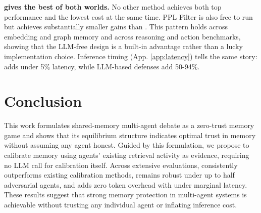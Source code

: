  \textbf{\system gives the best of both worlds.} No other method achieves both top performance and the lowest cost at the same time. PPL Filter is also free to run but achieves substantially smaller gains than \system. This pattern holds across embedding and graph memory and across reasoning and action benchmarks, showing that the LLM-free design is a built-in advantage rather than a lucky implementation choice. Inference timing (App. \ref{app:latency}) tells the same story: \system adds under 5\% latency, while LLM-based defenses add 50-94\%.




\section{Conclusion}


This work formulates shared-memory multi-agent debate as a zero-trust memory game and shows that its equilibrium structure indicates optimal trust in memory without assuming any agent honest. Guided by this formulation, we propose \system to calibrate memory using agents' existing retrieval activity as evidence, requiring no LLM call for calibration itself. Across extensive evaluations, \system consistently outperforms existing calibration methods, remains robust under up to half adversarial agents, and adds zero token overhead with under marginal latency. These results suggest that strong memory protection in multi-agent systems is achievable without trusting any individual agent or inflating inference cost.



